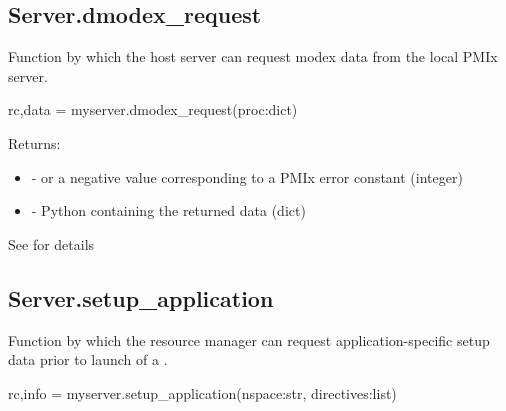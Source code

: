 \subsection{Server.dmodex_request}

\summary
Function by which the host server can request modex data from the local PMIx server.

\format

\pyspecificstart
\begin{codepar}
rc,data = myserver.dmodex_request(proc:dict)
\end{codepar}
\pyspecificend


\begin{arglist}
\end{arglist}

Returns:

\begin{itemize}
    \item {} -  or a negative value corresponding to a PMIx error constant (integer)
    \item {} - Python  containing the returned data (dict)
\end{itemize}


See  for details


\subsection{Server.setup_application}

\summary
Function by which the resource manager can request application-specific setup data prior to launch of a .

\format

\pyspecificstart
\begin{codepar}
rc,info = myserver.setup_application(nspace:str, directives:list)
\end{codepar}
\pyspecificend


\begin{arglist}
\end{arglist}

